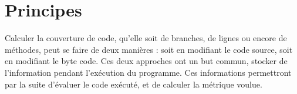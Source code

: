 \section{Principes}
\label{sec:principes}

Calculer la couverture de code, qu'elle soit de branches, de lignes ou encore de méthodes, peut se faire de deux manières\cite{baxter} : soit en modifiant le code source, soit en modifiant le byte code. Ces deux approches ont un but commun, stocker de l’information pendant l’exécution du programme. Ces informations permettront par la suite d’évaluer le code exécuté, et de calculer la métrique voulue.

